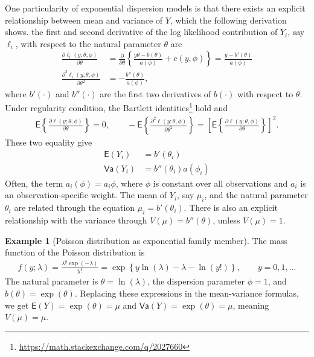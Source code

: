 \documentclass[
  11pt,
  letterpaper,
]{book}
\renewcommand{\href}[2]{#2\footnote{\url{#1}}}
\theoremstyle{definition}
\theoremstyle{definition}
\newtheorem{example}{Example}[chapter]
\theoremstyle{definition}
\theoremstyle{remark}
\begin{document}
One particularity of exponential dispersion models is that there exists
an explicit relationship between mean and variance of \(Y\), which the
following derivation shows. the first and second derivative of the log
likelihood contribution of \(Y_i\), say \(\ell_i\), with respect to the
natural parameter \(\theta\) are
\begin{align*}
\frac{\partial \ell_i(y; \theta, \phi)}{\partial \theta} &= \frac{\partial}{\partial \theta} \left\{\frac{y\theta-b(\theta)}{a(\phi)} + c(y, \phi) \right\} = \frac{y - b'(\theta)}{a(\phi)}\\
\frac{\partial^2 \ell_i(y; \theta, \phi)}{\partial \theta^2} &= - \frac{b''(\theta)}{a(\phi)},
\end{align*}
where \(b'(\cdot)\) and \(b''(\cdot)\) are the first two
derivatives of \(b(\cdot)\) with respect to \(\theta\). Under regularity
condition, the \href{https://math.stackexchange.com/q/2027660}{Bartlett
identities} hold and
\begin{align*}
\mathsf{E}\left\{\frac{\partial \ell(y; \theta, \phi)}{\partial \theta}\right\}=0, \qquad - \mathsf{E}\left\{\frac{\partial^2 \ell(y; \theta, \phi)}{\partial \theta^2}\right\} = \left[\mathsf{E}\left\{\frac{\partial \ell(y; \theta, \phi)}{\partial \theta}\right\}\right]^2.
\end{align*}
These two equality give
\begin{align*}
\mathsf{E}(Y_i) &= b'(\theta_i) \\
\mathsf{Va}(Y_i) &= b''(\theta_i)a(\phi_i)
\end{align*}
Often, the term \(a_i(\phi)=a_i\phi\), where \(\phi\) is
constant over all observations and \(a_i\) is an observation-specific
weight. The mean of \(Y_i\), say \(\mu_i\), and the natural parameter
\(\theta_i\) are related through the equation \(\mu_i=b'(\theta_i)\). There
is also an explicit relationship with the variance through
\(V(\mu)=b''(\theta)\), unless \(V(\mu)=1\).

\begin{example}[Poisson distribution as exponential family member]
\protect\hypertarget{exm:poissonglmexpf}{}{\label{exm:poissonglmexpf} {} }The mass function of the Poisson distribution is
\begin{align*}
f(y; \lambda) = \frac{\lambda^y \exp(-\lambda)}{y!} =\exp \left\{ y \ln
(\lambda) -\lambda-\ln(y!)\right\}, \qquad y=0,1, \ldots
\end{align*}
The natural parameter is \(\theta =\ln(\lambda)\), the dispersion
parameter \(\phi=1\), and \(b(\theta)=\exp(\theta)\). Replacing these expressions in the mean-variance formulas, we get \(\mathsf{E}(Y)=\exp(\theta)=\mu\) and \(\mathsf{Va}(Y)=\exp(\theta)=\mu\), meaning \(V(\mu)=\mu\).
\end{example}
\end{document}
